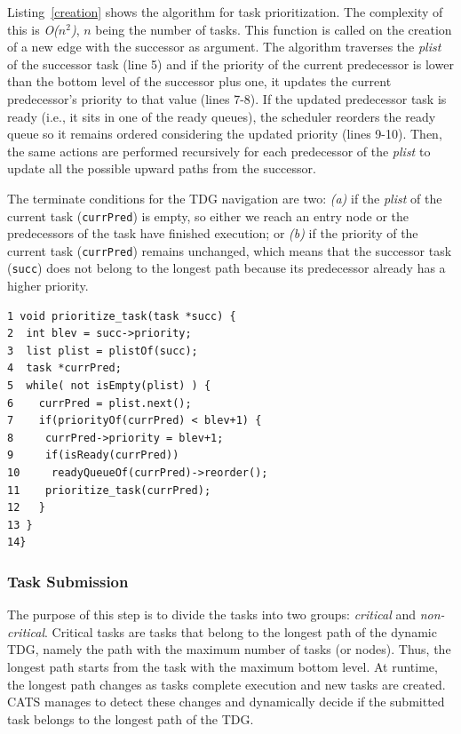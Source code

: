 Listing~\ref{creation} shows the algorithm for task prioritization. The complexity of this is \textit{O($n^2$)}, \textit{$n$} being the number of tasks. This function is called on the creation of a new edge with the successor as argument. The algorithm traverses the \textit{plist} of the successor task (line 5) and if the priority of the current predecessor is lower than the bottom level of the successor plus one, it updates the current predecessor's priority to that value (lines 7-8). If the updated predecessor task is ready (i.e., it sits in one of the ready queues), the scheduler reorders the ready queue so it remains ordered considering the updated priority (lines 9-10). Then, the same actions are performed recursively for each predecessor of the \textit{plist} to update all the possible upward paths from the successor. 

The terminate conditions for the TDG navigation are two: \textit{(a)} if the \textit{plist} of the current task (\texttt{currPred}) is empty, so either we reach an entry node or the predecessors of the task have finished execution; or \textit{(b)} if the priority of the current task (\texttt{currPred}) remains unchanged, which means that the successor task (\texttt{succ}) does not belong to the longest path because its predecessor already has a higher priority. 
\begin{lstlisting}[float, emph={void,if,return,non_critical_queue, critical_queue,prioritize_task}, captionpos=b, caption={Pseudo-code task prioritization with CATS.},label=creation, emph={[2]mat}, emphstyle={[2]}, aboveskip={0\baselineskip}, frame=tb, belowskip={-0.4cm}]
1 void prioritize_task(task *succ) {
2  int blev = succ->priority;
3  list plist = plistOf(succ);
4  task *currPred;
5  while( not isEmpty(plist) ) {
6    currPred = plist.next();  
7    if(priorityOf(currPred) < blev+1) {
8     currPred->priority = blev+1;
9     if(isReady(currPred)) 
10     readyQueueOf(currPred)->reorder();
11    prioritize_task(currPred);
12   }
13 }
14}
\end{lstlisting}
\subsubsection{Task Submission}


The purpose of this step is to divide the tasks into two groups: \textit{critical} and \textit{non-critical}. Critical tasks are tasks that belong to the longest path of the dynamic TDG, namely the path  with the maximum number of tasks (or nodes). Thus, the longest path starts from the task with the maximum bottom level. At runtime, the longest path changes as tasks complete execution and new tasks are created. CATS manages to detect these changes and dynamically decide if the submitted task belongs to the longest path of the TDG.

